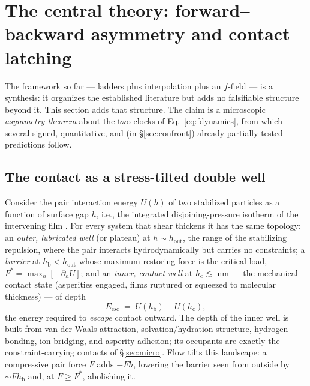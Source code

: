 \documentclass[11pt]{article}
\newcommand{\Fstar}{F^{*}}
\begin{document}
\section{The central theory: forward--backward asymmetry and contact latching}
\label{sec:latching}

The framework so far --- ladders plus interpolation plus an $f$-field --- is a synthesis: it organizes the established literature but adds no falsifiable structure beyond it. This section adds that structure. The claim is a microscopic \emph{asymmetry theorem} about the two clocks of Eq.~\eqref{eq:fdynamics}, from which several signed, quantitative, and (in \S\ref{sec:confront}) already partially tested predictions follow.

\subsection{The contact as a stress-tilted double well}
\label{sec:doublewell}
Consider the pair interaction energy $U(h)$ of two stabilized particles as a function of surface gap $h$, i.e., the integrated disjoining-pressure isotherm of the intervening film \cite{israelachvili}. For every system that shear thickens it has the same topology: an \emph{outer, lubricated well} (or plateau) at $h \sim h_{\mathrm{out}}$, the range of the stabilizing repulsion, where the pair interacts hydrodynamically but carries no constraints; a \emph{barrier} at $h_{\mathrm{b}} < h_{\mathrm{out}}$ whose maximum restoring force is the critical load, $\Fstar = \max_h[-\partial_h U]$; and an \emph{inner, contact well} at $h_{\mathrm{c}} \lesssim$ nm --- the mechanical contact state (asperities engaged, films ruptured or squeezed to molecular thickness) --- of depth
\begin{equation}
E_{\mathrm{esc}} \;=\; U(h_{\mathrm{b}}) - U(h_{\mathrm{c}}),
\label{eq:Eesc}
\end{equation}
the energy required to \emph{escape} contact outward. The depth of the inner well is built from van der Waals attraction, solvation/hydration structure, hydrogen bonding, ion bridging, and asperity adhesion; its occupants are exactly the constraint-carrying contacts of \S\ref{sec:micro}. Flow tilts this landscape: a compressive pair force $F$ adds $-Fh$, lowering the barrier seen from outside by $\sim F h_{\mathrm{b}}$ and, at $F \ge \Fstar$, abolishing it.
\end{document}
